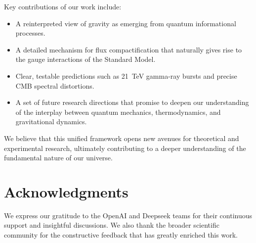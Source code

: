 \documentclass[12pt, a4paper]{article}
\begin{document}
Key contributions of our work include:
\begin{itemize}
    \item A reinterpreted view of gravity as emerging from quantum informational processes.
    \item A detailed mechanism for flux compactification that naturally gives rise to the gauge interactions of the Standard Model.
    \item Clear, testable predictions such as 21~TeV gamma-ray bursts and precise CMB spectral distortions.
    \item A set of future research directions that promise to deepen our understanding of the interplay between quantum mechanics, thermodynamics, and gravitational dynamics.
\end{itemize}

We believe that this unified framework opens new avenues for theoretical and experimental research, ultimately contributing to a deeper understanding of the fundamental nature of our universe.

\section*{Acknowledgments}
We express our gratitude to the OpenAI and Deepseek teams for their continuous support and insightful discussions. We also thank the broader scientific community for the constructive feedback that has greatly enriched this work.



\end{document}
